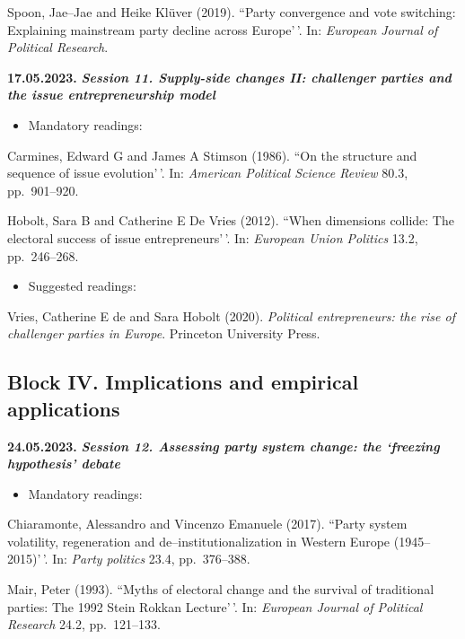 \documentclass[
  12pt,
]{article}
\providecommand{\tightlist}{%
  \setlength{\itemsep}{0pt}\setlength{\parskip}{0pt}}
\begin{document}
Spoon, Jae--Jae and Heike Klüver (2019). ``Party convergence and vote
switching: Explaining mainstream party decline across Europe'\,'. In:
\emph{European Journal of Political Research}.

\textbf{17.05.2023.} \textbf{\emph{Session 11. Supply-side changes II:
challenger parties and the issue entrepreneurship model}}

\begin{itemize}
\tightlist
\item
  Mandatory readings:
\end{itemize}

Carmines, Edward G and James A Stimson (1986). ``On the structure and
sequence of issue evolution'\,'. In:
\emph{American Political Science Review} 80.3, pp.~901--920.

Hobolt, Sara B and Catherine E De Vries (2012). ``When dimensions
collide: The electoral success of issue entrepreneurs'\,'. In:
\emph{European Union Politics} 13.2, pp.~246--268.

\begin{itemize}
\tightlist
\item
  Suggested readings:
\end{itemize}

Vries, Catherine E de and Sara Hobolt (2020).
\emph{Political entrepreneurs: the rise of challenger parties in Europe}.
Princeton University Press.

\hypertarget{block-iv.-implications-and-empirical-applications}{%
\subsection{Block IV. Implications and empirical
applications}\label{block-iv.-implications-and-empirical-applications}}

\textbf{24.05.2023.} \textbf{\emph{Session 12. Assessing party system
change: the `freezing hypothesis' debate}}

\begin{itemize}
\tightlist
\item
  Mandatory readings:
\end{itemize}

Chiaramonte, Alessandro and Vincenzo Emanuele (2017). ``Party system
volatility, regeneration and de--institutionalization in Western Europe
(1945--2015)'\,'. In: \emph{Party politics} 23.4, pp.~376--388.

Mair, Peter (1993). ``Myths of electoral change and the survival of
traditional parties: The 1992 Stein Rokkan Lecture'\,'. In:
\emph{European Journal of Political Research} 24.2, pp.~121--133.
\end{document}
